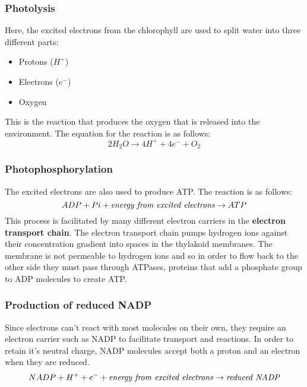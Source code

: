 \documentclass{article}
\begin{document}
\subsubsection*{Photolysis}
Here, the excited electrons from the chlorophyll are used to split water into three different parts:
\begin{itemize}
	\item Protons ($H^{+}$)
	\item Electrons ($e^{-}$)
	\item Oxygen
\end{itemize}
This is the reaction that produces the oxygen that is released into the environment. The equation for the reaction is as follows:
\[
	2H_2O \rightarrow 4H^+ + 4e^- + O_2
\]

\subsubsection*{Photophosphorylation}
The excited electrons are also used to produce ATP. The reaction is as follows:
\[
	ADP + Pi + \textrm{\textit{energy from excited electrons}} \rightarrow ATP
\]
This process is facilitated by many different electron carriers in the \textbf{electron transport chain}. The electron transport chain pumps hydrogen ions against their concentration gradient into spaces in the thylakoid membranes. The membrane is not permeable to hydrogen ions and so in order to flow back to the other side they must pass through ATPases, proteins that add a phosphate group to ADP molecules to create ATP.

\begin{center}
\end{center}

\newpage
\subsubsection*{Production of reduced NADP}
Since electrons can't react with most molecules on their own, they require an electron carrier such as NADP to facilitate transport and reactions. In order to retain it's neutral charge, NADP molecules accept both a proton and an electron when they are reduced.
\[
	NADP + H^+ + e^- +\textrm{\textit{energy from excited electrons}}\rightarrow \textrm{\textit{reduced NADP}}
\]
\end{document}
